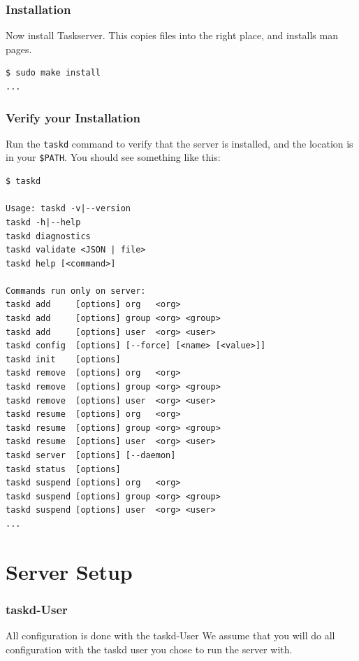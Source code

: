 \documentclass[t,handout]{beamer}
\begin{document}
\begin{frame}[fragile]\frametitle{Installation}
    \vfill
    Now install Taskserver. This copies files into the right place, and installs man pages.

    \begin{lstlisting}
$ sudo make install
...\end{lstlisting}
\end{frame}

\begin{frame}[fragile]\frametitle{Verify your Installation}
    \vfill
    Run the \verb+taskd+ command to verify that the server is installed, and the location is in your \verb+$PATH+. You should see something like this:

    \begin{lstlisting}
$ taskd

Usage: taskd -v|--version
taskd -h|--help
taskd diagnostics
taskd validate <JSON | file>
taskd help [<command>]

Commands run only on server:
taskd add     [options] org   <org>
taskd add     [options] group <org> <group>
taskd add     [options] user  <org> <user>
taskd config  [options] [--force] [<name> [<value>]]
taskd init    [options]
taskd remove  [options] org   <org>
taskd remove  [options] group <org> <group>
taskd remove  [options] user  <org> <user>
taskd resume  [options] org   <org>
taskd resume  [options] group <org> <group>
taskd resume  [options] user  <org> <user>
taskd server  [options] [--daemon]
taskd status  [options]
taskd suspend [options] org   <org>
taskd suspend [options] group <org> <group>
taskd suspend [options] user  <org> <user>
...\end{lstlisting}
\end{frame}

\section{Server Setup}

\begin{frame}[fragile]\frametitle{taskd-User}
    \vfill
    \begin{alertblock}{All configuration is done with the taskd-User}
        We assume that you will do all configuration with the taskd user you chose to run the server with.
	\end{alertblock}
\end{frame}
\end{document}
